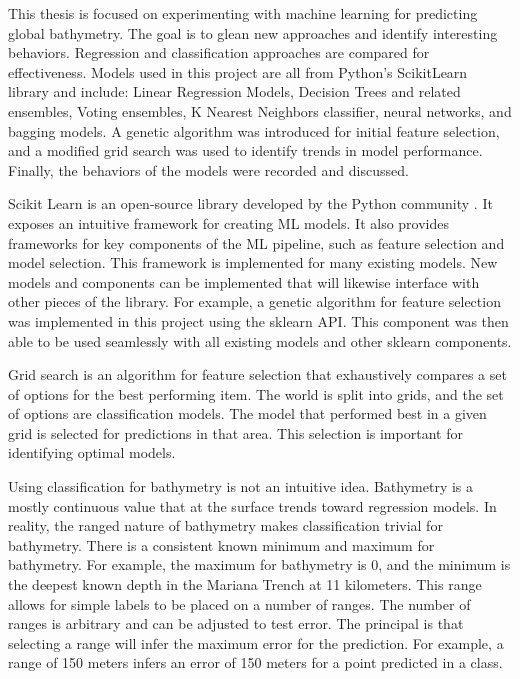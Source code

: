 \par
This thesis is focused on experimenting with machine learning for predicting global bathymetry.
The goal is to glean new approaches and identify interesting behaviors.
Regression and classification approaches are compared for effectiveness.
Models used in this project are all from Python's ScikitLearn library and include: Linear Regression Models, Decision Trees and related ensembles, Voting ensembles, K Nearest Neighbors classifier, neural networks, and bagging models.
A genetic algorithm was introduced for initial feature selection, and a modified grid search was used to identify trends in model performance.
Finally, the behaviors of the models were recorded and discussed.

\par
Scikit Learn is an open-source library developed by the Python community \cite{scikit-learn}.
It exposes an intuitive framework for creating \ac{ML} models.
It also provides frameworks for key components of the \ac{ML} pipeline, such as feature selection and model selection.
This framework is implemented for many existing models.
New models and components can be implemented that will likewise interface with other pieces of the library.
For example, a genetic algorithm for feature selection was implemented in this project using the sklearn \ac{API}.
This component was then able to be used seamlessly with all existing models and other sklearn components.

\par
Grid search is an algorithm for feature selection that exhaustively compares a set of options for the best performing item.
The world is split into grids, and the set of options are classification models.
The model that performed best in a given grid is selected for predictions in that area.
This selection is important for identifying optimal models.


\par
Using classification for bathymetry is not an intuitive idea.
Bathymetry is a mostly continuous value that at the surface trends toward regression models.
In reality, the ranged nature of bathymetry makes classification trivial for bathymetry.
There is a consistent known minimum and maximum for bathymetry.
For example, the maximum for bathymetry is 0, and the minimum is the deepest known depth in the Mariana Trench at 11 kilometers.
This range allows for simple labels to be placed on a number of ranges.
The number of ranges is arbitrary and can be adjusted to test error.
The principal is that selecting a range will infer the maximum error for the prediction.
For example, a range of 150 meters infers an error of 150 meters for a point predicted in a class.





